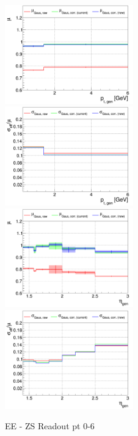 \begin{figure}
\includegraphics[width=0.495\textwidth]{./ECAL_plots/plotsPU/EE/ZS/pdf/GENPT/EEZS_GENPT_0000_0006_MuOverBins.pdf}
\includegraphics[width=0.495\textwidth]{./ECAL_plots/plotsPU/EE/ZS/pdf/GENPT/EEZS_GENPT_0000_0006_EffSigmaOverBins.pdf}
\includegraphics[width=0.495\textwidth]{./ECAL_plots/plotsPU/EE/ZS/pdf/GENETA/EEZS_GENETA_0000_0006_MuOverBins.pdf}
\includegraphics[width=0.495\textwidth]{./ECAL_plots/plotsPU/EE/ZS/pdf/GENETA/EEZS_GENETA_0000_0006_EffSigmaOverBins.pdf}
\caption{EE - ZS Readout pt 0-6}
\end{figure}

